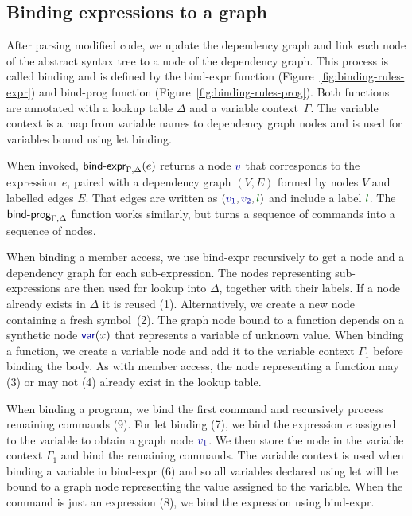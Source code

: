 \documentclass[english,submission]{programming}
\theoremstyle{plain}
\theoremstyle{definition}
\newcommand{\ident}[1]{\textnormal{\textcolor{idclr}{\sffamily #1}}}
\newcommand{\kvd}[1]{\textnormal{\textcolor{kvdclr}{\sffamily #1}}}
\newcommand{\bndclr}[1]{\textcolor{kvdclr}{#1}}
\newcommand{\blblclr}[1]{\textcolor{numclr}{#1}}
\newcommand{\bnd}[1]{\textnormal{\textcolor{kvdclr}{\sffamily #1}}}
\begin{document}

\subsection{Binding expressions to a graph}
\label{sec:formal-bind}

After parsing modified code, we update the dependency graph and link each node of the abstract
syntax tree to a node of the dependency graph. This process is called
binding and is defined by the \ident{bind-expr} function (Figure~\ref{fig:binding-rules-expr})
and \ident{bind-prog} function (Figure~\ref{fig:binding-rules-prog}). Both functions are
annotated with a lookup table $\Delta$ and a variable
context~$\Gamma$. The variable context is a map from variable names to dependency graph nodes and
is used for variables bound using \kvd{let} binding.

When invoked, $\ident{bind-expr}_{\Gamma,\Delta}(e)$ returns a node $\bndclr{v}$ that corresponds
to the expression~$e$, paired with a dependency graph $(V, E)$ formed by nodes $V$ and labelled
edges $E$. That edges are written as $(\bndclr{v_1}, \bndclr{v_2}, \blblclr{l})$ and include a
label $\blblclr{l}$. The $\ident{bind-prog}_{\Gamma,\Delta}$ function works similarly, but turns
a sequence of commands into a sequence of nodes.

When binding a member access, we use \ident{bind-expr} recursively
to get a node and a dependency graph for each sub-expression. The nodes representing sub-expressions are
then used for lookup into $\Delta$, together with their labels. If a node already
exists in $\Delta$ it is reused (1). Alternatively, we create a new node containing a fresh symbol~(2).
%
The graph node bound to a function depends on a synthetic node $\bnd{var}(x)$ that represents a
variable of unknown value. When binding a function, we create a variable node and add it
to the variable context $\Gamma_1$ before binding the body. As with member access, the node
representing a function may (3) or may not (4) already exist in the lookup table.

When binding a program, we bind the first command and
recursively process remaining commands (9). For \kvd{let} binding (7), we bind the expression $e$
assigned to the variable to obtain a graph node $\bndclr{v_1}$. We then store the node in the
variable context $\Gamma_1$ and bind the remaining commands. The variable context is used
when binding a variable in \ident{bind-expr} (6) and so all variables declared using \kvd{let}
will be bound to a graph node representing the value assigned to the variable. When the command
is just an expression (8), we bind the expression using \ident{bind-expr}.
\end{document}
